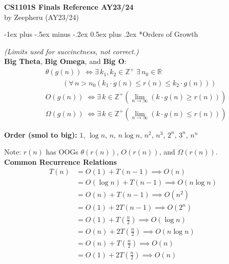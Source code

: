 \documentclass[10pt]{article}
\makeatletter
\renewcommand{\section}{\@startsection{section}{1}{0mm}%
                                {-1ex plus -.5ex minus -.2ex}%
                                {0.5ex plus .2ex}%
                                {\normalfont\large\bfseries}}
\makeatother
\begin{document}
\raggedright
\footnotesize



\begin{center}
{\large \textbf{CS1101S Finals Reference AY23/24}\\{by Zeepheru (AY23/24)}}
\end{center}
\hrulefill

\begin{multicols}{2}

\section*{Orders of Growth}

\textit{(Limits used for succinctness, not correct.)} \\ 
\textbf{Big Theta},  \textbf{Big Omega}, and \textbf{Big O}:
\begin{align*}
    & \theta(g(n))\; \iff \exists \, k_1, k_2 \in \mathbb{Z}^+ \; \exists \, n_0 \in \mathbb{R}  \\
    & \hspace{1cm} ( \forall \, n > n_0 (k_{1} \cdot g(n) \leq r(n) \leq k_{2} \cdot g(n))) \\
    & O(g(n))\; \iff \exists \, k \in \mathbb{Z}^+  ( \lim_{n \to \infty } (k \cdot g(n) \geq r(n) )) \\
    & \Omega(g(n))\; \iff \exists \, k \in \mathbb{Z}^+  ( \lim_{n \to \infty } (k \cdot g(n) \leq r(n) ))
\end{align*}

\textbf{Order (smol to big):} $1$, $\log n$, $n$, $n \log n$, $n^{2}$, $n^{3}$, $2^{n}$, $3^{n}$, $n^{n}$ \\
\smallskip

Note: $r(n)$ has OOGs $\theta(r(n))$, $O(r(n))$, and $\Omega(r(n))$. \\

{\textbf{Common Recurrence Relations}}
\begin{align*}
    T(n) & = O(1) + T(n-1) \implies O(n) \\
        & = O(\log n) + T(n-1) \implies O(n \log n) \\
        & = O(n) + T(n-1) \implies O(n^2) \\
        & = O(1) + 2T(n-1) \implies O(2^n) \\
        & = O(1) + T(\frac{n}{2}) \implies O(\log n) \\
        & = O(n) + 2T(\frac{n}{2}) \implies O(n \log n) \\ 
        & = O(n) + T(\frac{n}{2}) \implies O(n) \\
        & = O(1) + 2T(\frac{n}{2}) \implies O(n)
\end{align*}


\end{multicols}
\end{document}
